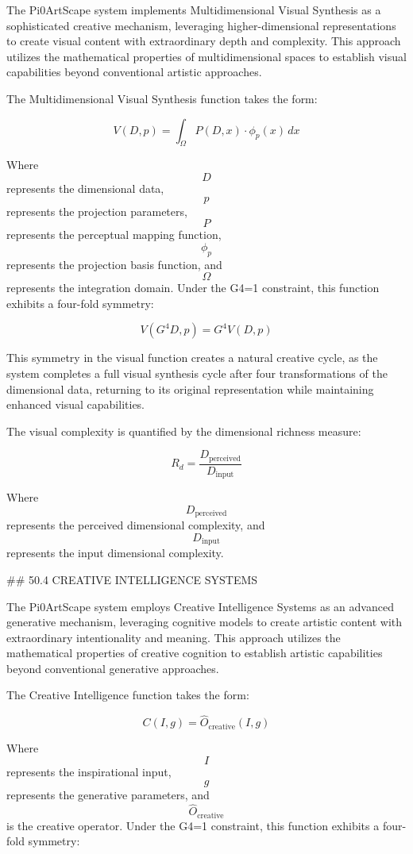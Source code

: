 The Pi0ArtScape system implements Multidimensional Visual Synthesis as a sophisticated creative mechanism, leveraging higher-dimensional representations to create visual content with extraordinary depth and complexity. This approach utilizes the mathematical properties of multidimensional spaces to establish visual capabilities beyond conventional artistic approaches.

The Multidimensional Visual Synthesis function takes the form:

$$ V(D, p) = \int_{\Omega} P(D, x) \cdot \phi_p(x) \, dx $$

Where $$ D $$ represents the dimensional data, $$ p $$ represents the projection parameters, $$ P $$ represents the perceptual mapping function, $$ \phi_p $$ represents the projection basis function, and $$ \Omega $$ represents the integration domain. Under the G4=1 constraint, this function exhibits a four-fold symmetry:

$$ V(G^4 D, p) = G^4 V(D, p) $$

This symmetry in the visual function creates a natural creative cycle, as the system completes a full visual synthesis cycle after four transformations of the dimensional data, returning to its original representation while maintaining enhanced visual capabilities.

The visual complexity is quantified by the dimensional richness measure:

$$ R_d = \frac{D_{\text{perceived}}}{D_{\text{input}}} $$

Where $$ D_{\text{perceived}} $$ represents the perceived dimensional complexity, and $$ D_{\text{input}} $$ represents the input dimensional complexity.

## 50.4 CREATIVE INTELLIGENCE SYSTEMS

The Pi0ArtScape system employs Creative Intelligence Systems as an advanced generative mechanism, leveraging cognitive models to create artistic content with extraordinary intentionality and meaning. This approach utilizes the mathematical properties of creative cognition to establish artistic capabilities beyond conventional generative approaches.

The Creative Intelligence function takes the form:

$$ C(I, g) = \hat{O}_{\text{creative}}(I, g) $$

Where $$ I $$ represents the inspirational input, $$ g $$ represents the generative parameters, and $$ \hat{O}_{\text{creative}} $$ is the creative operator. Under the G4=1 constraint, this function exhibits a four-fold symmetry:

